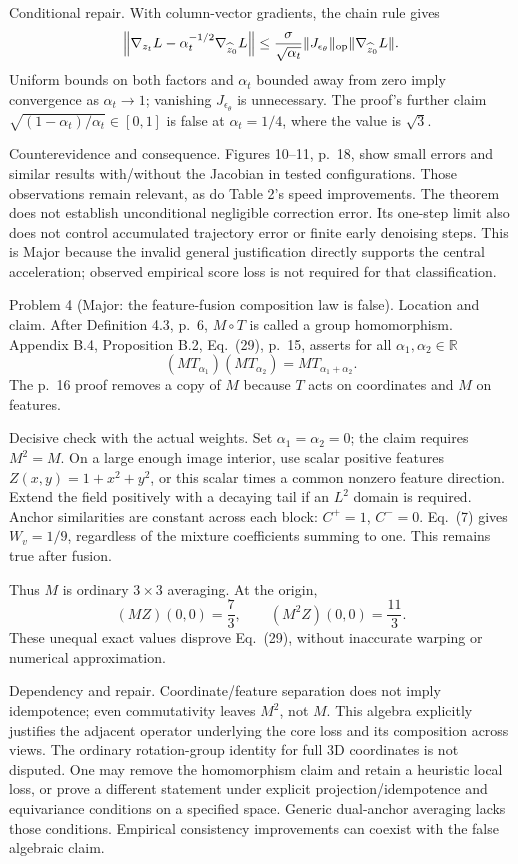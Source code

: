 \documentclass[10pt]{article}
\begin{document}
Conditional repair. With column-vector gradients, the chain rule gives \[\left\|\nabla_{z_t}L-\alpha_t^{-1/2}\nabla_{\widehat z_0}L\right\|
 \leq\frac{\sigma}{\sqrt{\alpha_t}}
       \|J_{\epsilon_\theta}\|_{\rm op}
       \|\nabla_{\widehat z_0}L\|.\] Uniform bounds on both factors and \(\alpha_t\) bounded away from zero imply convergence as \(\alpha_t\to1\); vanishing \(J_{\epsilon_\theta}\) is unnecessary. The proof’s further claim \(\sqrt{(1-\alpha_t)/\alpha_t}\in[0,1]\) is false at \(\alpha_t=1/4\), where the value is \(\sqrt3\).\par
Counterevidence and consequence. Figures 10–11, p. 18, show small errors and similar results with/without the Jacobian in tested configurations. Those observations remain relevant, as do Table 2’s speed improvements. The theorem does not establish unconditional negligible correction error. Its one-step limit also does not control accumulated trajectory error or finite early denoising steps. This is Major because the invalid general justification directly supports the central acceleration; observed empirical score loss is not required for that classification.\par
Problem 4 (Major: the feature-fusion composition law is false).  Location and claim. After Definition 4.3, p. 6, \(M\circ T\) is called a group homomorphism. Appendix B.4, Proposition B.2, Eq. (29), p. 15, asserts for all \(\alpha_1,\alpha_2\in\mathbb R\) \[(M T_{\alpha_1})(M T_{\alpha_2})=M T_{\alpha_1+\alpha_2}.\] The p. 16 proof removes a copy of \(M\) because \(T\) acts on coordinates and \(M\) on features.\par
Decisive check with the actual weights. Set \(\alpha_1=\alpha_2=0\); the claim requires \(M^2=M\). On a large enough image interior, use scalar positive features \(Z(x,y)=1+x^2+y^2\), or this scalar times a common nonzero feature direction. Extend the field positively with a decaying tail if an \(L^2\) domain is required. Anchor similarities are constant across each block: \(C^+=1\), \(C^-=0\). Eq. (7) gives \(W_v=1/9\), regardless of the mixture coefficients summing to one. This remains true after fusion.\par
Thus \(M\) is ordinary \(3\times3\) averaging. At the origin, \[(MZ)(0,0)=\frac73,\qquad (M^2Z)(0,0)=\frac{11}3.\] These unequal exact values disprove Eq. (29), without inaccurate warping or numerical approximation.\par
Dependency and repair. Coordinate/feature separation does not imply idempotence; even commutativity leaves \(M^2\), not \(M\). This algebra explicitly justifies the adjacent operator underlying the core loss and its composition across views. The ordinary rotation-group identity for full 3D coordinates is not disputed. One may remove the homomorphism claim and retain a heuristic local loss, or prove a different statement under explicit projection/idempotence and equivariance conditions on a specified space. Generic dual-anchor averaging lacks those conditions. Empirical consistency improvements can coexist with the false algebraic claim.\par
\end{document}

